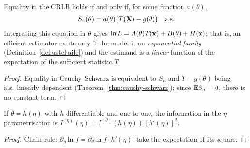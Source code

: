 \documentclass[main.tex]{subfiles}
\begin{document}
\begin{corollary}\label{cor:crlb-esitlik}
Equality in the CRLB holds if and only if, for some function $a(\theta)$,
\[
S_n(\theta)=a(\theta)\big(T(\mathbf{X})-g(\theta)\big)\quad\text{a.s.}
\]
Integrating this equation in $\theta$ gives $\ln L=A(\theta)T(\mathbf{x})+B(\theta)+H(\mathbf{x})$; that is, an efficient estimator exists only if the model is an \emph{exponential family} (Definition~\ref{def:ustel-aile}) and the estimand is a \emph{linear} function of the expectation of the sufficient statistic $T$.
\end{corollary}
\begin{proof}
Equality in Cauchy--Schwarz is equivalent to $S_n$ and $T-g(\theta)$ being a.s.\ linearly dependent (Theorem~\ref{thm:cauchy-schwarz}); since $\mathbb{E} S_n=0$, there is no constant term.
\end{proof}

\begin{proposition}[Reparametrisation]\label{prop:yeniden-param}
If $\theta=h(\eta)$ with $h$ differentiable and one-to-one, the information in the $\eta$ parametrisation is $I^{(\eta)}(\eta)=I^{(\theta)}(h(\eta))\,[h'(\eta)]^2$.
\end{proposition}
\begin{proof}
Chain rule: $\partial_\eta\ln f=\partial_\theta\ln f\cdot h'(\eta)$; take the expectation of its square.
\end{proof}
\end{document}

